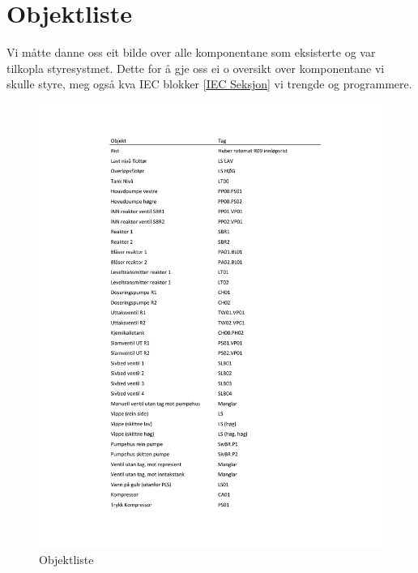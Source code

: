 \section{Objektliste}
\thispagestyle{fancy}

Vi måtte danne oss eit bilde over alle komponentane som eksisterte og var tilkopla styresystmet. Dette for å gje oss ei o
oversikt over komponentane vi skulle styre, meg også kva \gls{IEC} blokker \ref{IEC Seksjon} vi trengde og programmere.

\begin{figure}[htbp]
    \centering
    \includegraphics[scale=0.6, page=1]{Appendix/Objektliste_midlertidig.pdf}
    \caption{Objektliste}
    \label{fig:Objektliste}
\end{figure}

\newpage






